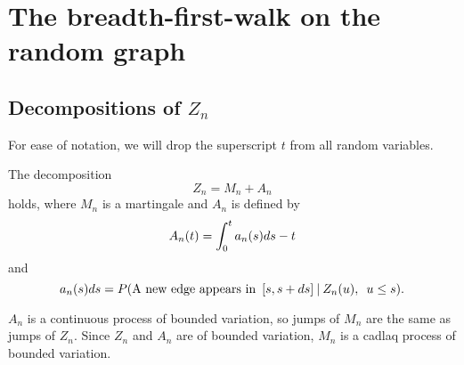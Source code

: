 
\chapter{The breadth-first-walk on the random graph}

\section{Decompositions of $Z_n$}

For ease of notation, we will drop the superscript $t$ from all random variables.

\begin{lemma} \label{L: decomp Zn}
	The decomposition 
	\begin{equation} \label{E: decomp Zn}
	Z_n = M_n + A_n
	\end{equation}
	holds, where $M_n$ is a martingale and $A_n$ is defined by
	\begin{equation} \label{D: An}
	A_n(t) = \int_{0}^{t} a_n(s)ds - t
	\end{equation}
	and
	\begin{equation} \label{D: an}
	a_n(s)ds = P(\text{A new edge appears in} \enspace [s, s+ds] \: | \: Z_n(u), \enspace u \leq s).
	\end{equation}	
\end{lemma}
\begin{note} \label{N: decomp Zn}
	$A_n$ is a continuous process of bounded variation, so jumps of $M_n$ are the same as jumps of $Z_n$. Since $Z_n$ and $A_n$ are of bounded variation, $M_n$ is a cadlaq process of bounded variation.
\end{note}
